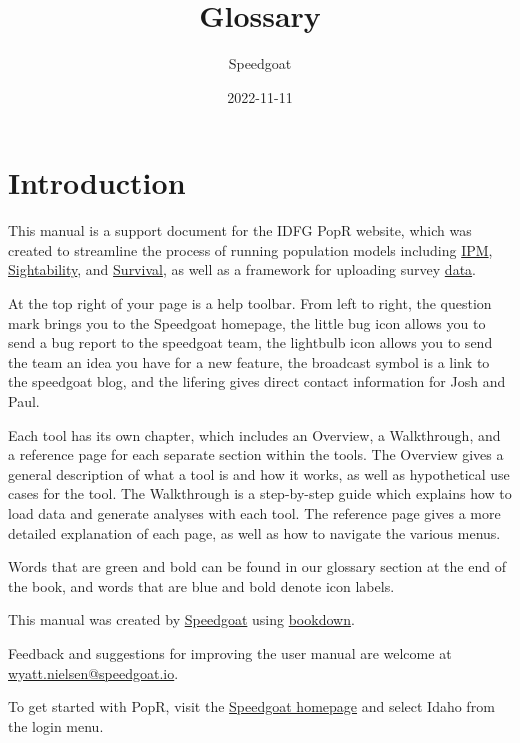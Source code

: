 \documentclass[
]{book}
\title{Glossary}
\author{Speedgoat}
\date{2022-11-11}
\begin{document}
\maketitle

{
\setcounter{tocdepth}{1}
\tableofcontents
}
\hypertarget{introduction}{%
\chapter{Introduction}\label{introduction}}

This manual is a support document for the IDFG PopR website, which was created to streamline the process of running population models including \protect\hyperlink{ipm}{IPM}, \protect\hyperlink{sight}{Sightability}, and \protect\hyperlink{surv}{Survival}, as well as a framework for uploading survey \protect\hyperlink{de}{data}.

At the top right of your page is a help toolbar. From left to right, the question mark brings you to the Speedgoat homepage, the little bug icon allows you to send a bug report to the speedgoat team, the lightbulb icon allows you to send the team an idea you have for a new feature, the broadcast symbol is a link to the speedgoat blog, and the lifering gives direct contact information for Josh and Paul.

Each tool has its own chapter, which includes an Overview, a Walkthrough, and a reference page for each separate section within the tools. The Overview gives a general description of what a tool is and how it works, as well as hypothetical use cases for the tool. The Walkthrough is a step-by-step guide which explains how to load data and generate analyses with each tool. The reference page gives a more detailed explanation of each page, as well as how to navigate the various menus.

Words that are {green and bold} can be found in our glossary section at the end of the book, and words that are {blue and bold} denote icon labels.

This manual was created by \href{https://www.speedgoat.io}{Speedgoat} using \href{https://bookdown.org/}{bookdown}.

Feedback and suggestions for improving the user manual are welcome at \href{mailto:wyatt.nielsen@speedgoat.io?cc=josh.nowak@speedgoat.io\&subject=PopR\%20Documentation\%20Feedback}{wyatt.nielsen@speedgoat.io}.

To get started with PopR, visit the \href{https://www.speedgoat.io/}{Speedgoat homepage} and select Idaho from the login menu.
\end{document}
